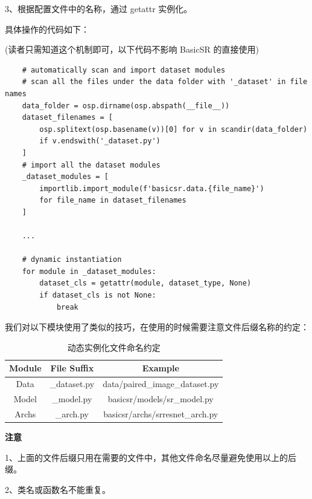 \documentclass[../main.tex]{subfiles}
\begin{document}
    3、根据配置文件中的名称，通过 getattr 实例化。

    具体操作的代码如下：

    (读者只需知道这个机制即可，以下代码不影响 BasicSR 的直接使用)
    \begin{verbatim}
    # automatically scan and import dataset modules
    # scan all the files under the data folder with '_dataset' in file names
    data_folder = osp.dirname(osp.abspath(__file__))
    dataset_filenames = [
        osp.splitext(osp.basename(v))[0] for v in scandir(data_folder)
        if v.endswith('_dataset.py')
    ]
    # import all the dataset modules
    _dataset_modules = [
        importlib.import_module(f'basicsr.data.{file_name}')
        for file_name in dataset_filenames
    ]

    ...

    # dynamic instantiation
    for module in _dataset_modules:
        dataset_cls = getattr(module, dataset_type, None)
        if dataset_cls is not None:
            break
    \end{verbatim}

    我们对以下模块使用了类似的技巧，在使用的时候需要注意文件后缀名称的约定：
    \begin{table}[h]
    \centering
    \begin{tabular}{|c|c|c|}
    \hline
    \textbf{Module} & \textbf{File Suffix} & \textbf{Example} \\ \hline
    Data & \_dataset.py & data/paired\_image\_dataset.py \\ \hline
    Model & \_model.py & basicsr/models/sr\_model.py \\ \hline
    Archs & \_arch.py & basicsr/archs/srresnet\_arch.py \\ \hline
    \end{tabular}
    \caption{动态实例化文件命名约定}
    \end{table}

    \begin{hl} %
    \textbf{注意}

    1、上面的文件后缀只用在需要的文件中，其他文件命名尽量避免使用以上的后缀。

    2、类名或函数名不能重复。
    \end{hl}
\end{document}

